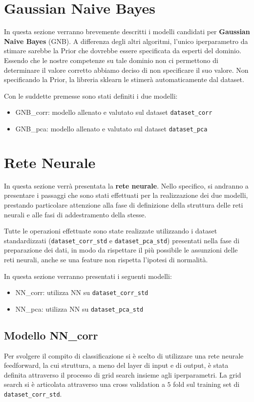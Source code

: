 \newpage
\section{Gaussian Naive Bayes}
In questa sezione verranno brevemente descritti i
modelli candidati per \textbf{Gaussian Naive Bayes} (GNB). A differenza
degli altri algoritmi, l'unico iperparametro da stimare sarebbe la Prior che
dovrebbe essere specificata da esperti del dominio. Essendo che le nostre
competenze su tale dominio non ci permettono di determinare il valore corretto
abbiamo deciso di non specificare il suo valore.
Non specificando la Prior, la libreria sklearn le stimerà automaticamente 
dal dataset.

Con le suddette premesse sono stati definiti i due modelli:
\begin{itemize}
    \item GNB\_corr: modello allenato e valutato sul dataset \texttt{dataset\_corr}
    \item GNB\_pca: modello allenato e valutato sul dataset \texttt{dataset\_pca}
\end{itemize}

\section{Rete Neurale}
In questa sezione verrà presentata la \textbf{rete neurale}. Nello specifico, si
andranno a presentare i passaggi che sono stati effettuati per la realizzazione
dei due modelli, prestando particolare attenzione alla fase di definizione
della struttura delle reti neurali e alle fasi di addestramento della stesse.

Tutte le operazioni effettuate sono state realizzate utilizzando i dataset standardizzati
(\texttt{dataset\_corr\_std} e \texttt{dataset\_pca\_std}) presentati nella fase
di preparazione dei dati, in modo da rispettare il più possibile le assunzioni
delle reti neurali, anche se una feature non rispetta l'ipotesi di normalità.

In questa sezione verranno presentati i seguenti modelli:
\begin{itemize}
    \item NN\_corr: utilizza NN su \texttt{dataset\_corr\_std}
    \item NN\_pca: utilizza NN su \texttt{dataset\_pca\_std}
\end{itemize}

\subsection{Modello NN\_corr}
Per svolgere il compito di classificazione si è scelto di utilizzare una rete
neurale feedforward, la cui struttura, a meno del layer di input e di output, è
stata definita attraverso il processo di grid search insieme agli iperparametri.
La grid search si è articolata attraverso una cross validation a $5$ fold sul training
set di \texttt{dataset\_corr\_std}.

